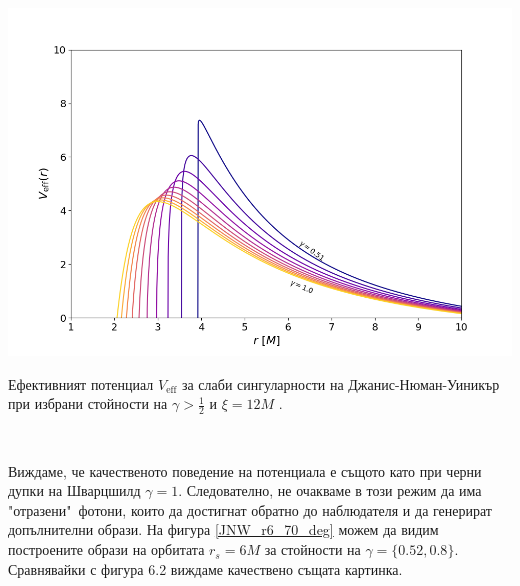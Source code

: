 \begin{minipage}{18em}
	\hspace{-0.5cm}
	\includegraphics[scale = 0.3]{JNW_eff_potential_photon_sphere.png}
	\caption[Ефективният потенциал за слаби сингуларности на Джанис-Нюман-Уиникър]{Ефективният потенциал $V_\text{eff}$ за слаби сингуларности на Джанис-Нюман-Уиникър при избрани стойности на $\gamma > \frac{1}{2}$ и $\xi = 12M$ \cite{Gyulchev2020}.}
\end{minipage}\,\,
\begin{minipage}{18em}
	Виждаме, че качественото поведение на потенциала е същото като при черни дупки на Шварцшилд $\gamma = 1$. Следователно, не очакваме в този режим да има "отразени"$\,$ фотони, които да достигнат обратно до наблюдателя и да генерират допълнителни образи. На фигура \ref{JNW_r6_70_deg} можем да видим построените образи на орбитата $r_s = 6M$ за стойности на $\gamma = \{0.52, 0.8\}$. Сравнявайки с фигура 6.2 виждаме качествено същата картинка.
\end{minipage}
